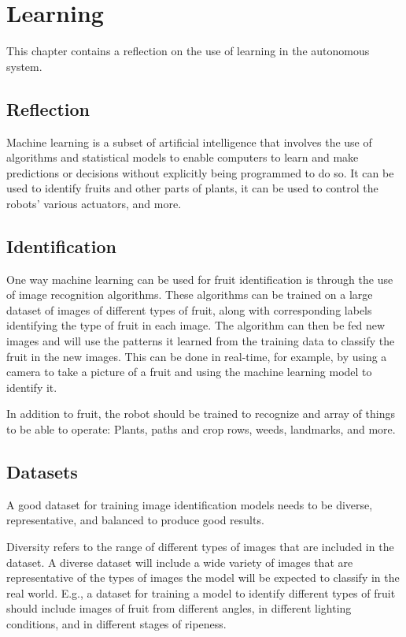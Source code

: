 \documentclass[%
oneside,    %
project,    %
nosummary   %
]{USN-MSc}
\begin{document}
\chapter{Learning}
\label{ch:learn}
This chapter contains a reflection on the use of learning in the autonomous system.
\section{Reflection}
Machine learning is a subset of artificial intelligence that involves the use of algorithms and statistical models to enable computers to learn and make predictions or decisions without explicitly being programmed to do so. It can be used to identify fruits and other parts of plants, it can be used to control the robots' various actuators, and more.

\section{Identification}
One way machine learning can be used for fruit identification is through the use of image recognition algorithms. These algorithms can be trained on a large dataset of images of different types of fruit, along with corresponding labels identifying the type of fruit in each image. The algorithm can then be fed new images and will use the patterns it learned from the training data to classify the fruit in the new images. This can be done in real-time, for example, by using a camera to take a picture of a fruit and using the machine learning model to identify it.

In addition to fruit, the robot should be trained to recognize and array of things to be able to operate: Plants, paths and crop rows, weeds, landmarks, and more.

\section{Datasets}
A good dataset for training image identification models needs to be diverse, representative, and balanced to produce good results.

Diversity refers to the range of different types of images that are included in the dataset. A diverse dataset will include a wide variety of images that are representative of the types of images the model will be expected to classify in the real world. E.g., a dataset for training a model to identify different types of fruit should include images of fruit from different angles, in different lighting conditions, and in different stages of ripeness.
\end{document}

